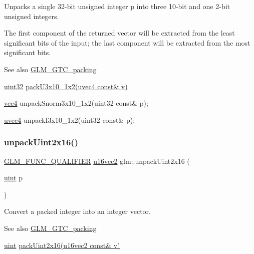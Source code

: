 Unpacks a single 32-\/bit unsigned integer p into three 10-\/bit and one 2-\/bit unsigned integers.

The first component of the returned vector will be extracted from the least significant bits of the input; the last component will be extracted from the most significant bits.

\begin{DoxySeeAlso}{See also}
\hyperlink{group__gtc__packing}{G\+L\+M\+\_\+\+G\+T\+C\+\_\+packing} 

\hyperlink{group__gtc__type__precision_ga202b6a53c105fcb7e531f9b443518451}{uint32} \hyperlink{group__gtc__packing_gaf656d8862628f96b20de7a36eaa1fe56}{pack\+U3x10\+\_\+1x2(uvec4 const\& v)} 

\hyperlink{group__core__types_ga5881b1b022d7fd1b7218f5916532dd02}{vec4} unpack\+Snorm3x10\+\_\+1x2(uint32 const\& p); 

\hyperlink{group__core__types_ga1c426d19627b32b14f0089f7f4ba7b1d}{uvec4} unpack\+I3x10\+\_\+1x2(uint32 const\& p); 
\end{DoxySeeAlso}
\mbox{\label{group__gtc__packing_ga7778efa924e6efc386cb9f373bb06b72}} 
\subsubsection{\texorpdfstring{unpack\+Uint2x16()}{unpackUint2x16()}}
{\footnotesize\ttfamily \hyperlink{setup_8hpp_a33fdea6f91c5f834105f7415e2a64407}{G\+L\+M\+\_\+\+F\+U\+N\+C\+\_\+\+Q\+U\+A\+L\+I\+F\+I\+ER} \hyperlink{group__gtc__type__precision_ga50bd2ceeb100a187e7c46f135269a0ec}{u16vec2} glm\+::unpack\+Uint2x16 (\begin{DoxyParamCaption}\item[{\hyperlink{group__core__precision_ga4fd29415871152bfb5abd588334147c8}{uint}}]{p }\end{DoxyParamCaption})}

Convert a packed integer into an integer vector.

\begin{DoxySeeAlso}{See also}
\hyperlink{group__gtc__packing}{G\+L\+M\+\_\+\+G\+T\+C\+\_\+packing} 

\hyperlink{group__core__precision_ga4fd29415871152bfb5abd588334147c8}{uint} \hyperlink{group__gtc__packing_gad5ca2e64edae3c233657c9fb0d18a9c9}{pack\+Uint2x16(u16vec2 const\& v)} 
\end{DoxySeeAlso}
\mbox{\label{group__gtc__packing_gab211ea5f8cf86f00efa4fd53cb302c82}} 
